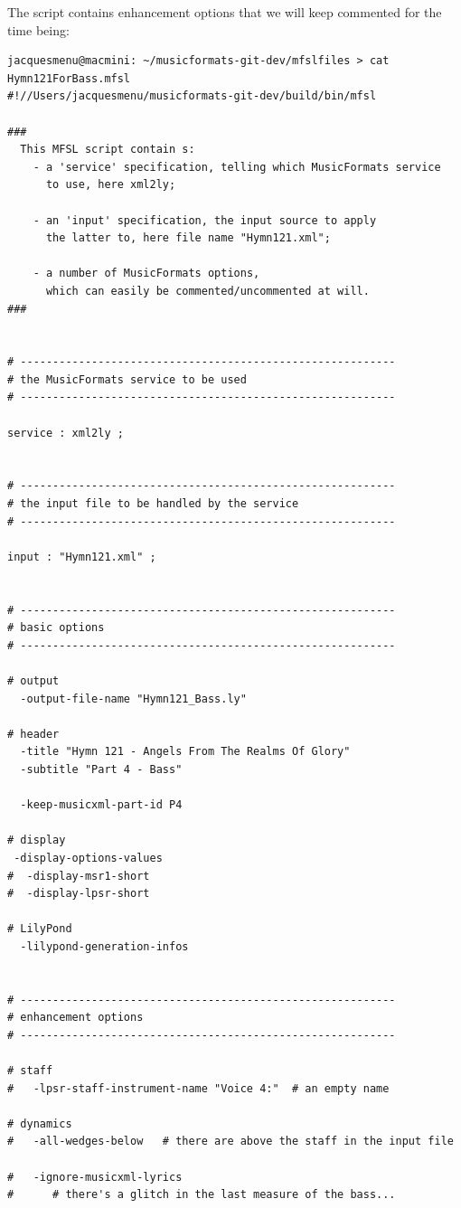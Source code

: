 The  script contains enhancement options that we will keep commented for the time being:
\begin{lstlisting}[language=MFSL]
jacquesmenu@macmini: ~/musicformats-git-dev/mfslfiles > cat Hymn121ForBass.mfsl
#!//Users/jacquesmenu/musicformats-git-dev/build/bin/mfsl

###
  This MFSL script contain s:
    - a 'service' specification, telling which MusicFormats service
      to use, here xml2ly;

    - an 'input' specification, the input source to apply
      the latter to, here file name "Hymn121.xml";

    - a number of MusicFormats options,
      which can easily be commented/uncommented at will.
###


# ----------------------------------------------------------
# the MusicFormats service to be used
# ----------------------------------------------------------

service : xml2ly ;


# ----------------------------------------------------------
# the input file to be handled by the service
# ----------------------------------------------------------

input : "Hymn121.xml" ;


# ----------------------------------------------------------
# basic options
# ----------------------------------------------------------

# output
  -output-file-name "Hymn121_Bass.ly"

# header
  -title "Hymn 121 - Angels From The Realms Of Glory"
  -subtitle "Part 4 - Bass"

  -keep-musicxml-part-id P4

# display
 -display-options-values
#  -display-msr1-short
#  -display-lpsr-short

# LilyPond
  -lilypond-generation-infos


# ----------------------------------------------------------
# enhancement options
# ----------------------------------------------------------

# staff
#   -lpsr-staff-instrument-name "Voice 4:"  # an empty name

# dynamics
#   -all-wedges-below   # there are above the staff in the input file

#   -ignore-musicxml-lyrics
#      # there's a glitch in the last measure of the bass...
\end{lstlisting}

